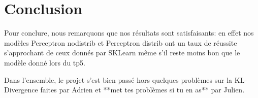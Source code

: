 \section{Conclusion}

Pour conclure, nous remarquons que nos résultats sont satisfaisants:
en effet nos modèles Perceptron nodistrib et Perceptron distrib ont un
taux de réussite s'approchant de ceux donnés par SKLearn
même s'il reste moins bon que le modèle donné lors du tp5.

Dans l'ensemble, le projet s'est bien passé hors quelques problèmes
sur la KL-Divergence faites par Adrien et **met tes problèmes si tu en as** par Julien.  
